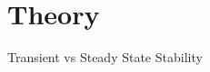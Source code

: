 \section[Theory]{Theory}
\label{sec:lasso_theory}

\begin{frame}[fragile]{Transient vs Steady State Stability}
	
\end{frame}
